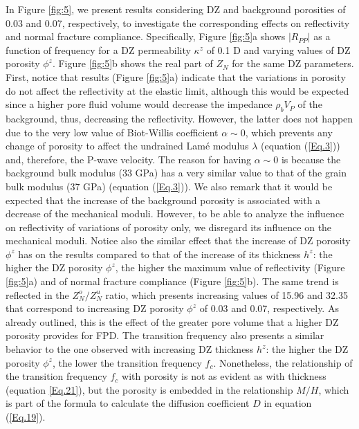 \documentclass[draft]{agujournal2019}
\begin{document}
In Figure \ref{fig:5}, we present results considering  DZ and background porosities of 0.03 and 0.07, respectively, to investigate the corresponding effects on reflectivity and normal fracture compliance. Specifically, Figure \ref{fig:5}a shows $|R_{PP}|$ as a function of frequency for a DZ permeability $ \kappa^z $ of 0.1 D and varying values of DZ porosity $\phi^z$. Figure \ref{fig:5}b shows the real part of $Z_N$ for the same DZ parameters.
First, notice that  results (Figure \ref{fig:5}a)  indicate that the variations in porosity do not affect the reflectivity at the elastic limit, although this would be expected since a higher pore fluid volume would decrease the impedance $\rho_b V_P$ of the background, thus, decreasing the reflectivity. However, the latter does not happen due to the very low value of Biot-Willis coefficient $\alpha \sim 0$, which prevents any change of porosity to affect the undrained Lamé modulus $\lambda$ (equation (\ref{Eq.3})) and, therefore, the  P-wave velocity. The reason for having  $\alpha \sim 0$ is because the background bulk modulus (33 GPa) has a very similar value to that of the grain bulk modulus (37 GPa) (equation (\ref{Eq.3})). We also remark that it would be expected that the increase of the background porosity is associated with a decrease of the mechanical moduli. However, to be able to analyze the influence on reflectivity of variations of porosity only, we disregard its influence on the mechanical moduli.
Notice also the similar effect that the increase of DZ porosity $\phi^z$ has on the results compared to that of the increase of its thickness $h^z$: the higher the DZ porosity $\phi^z$, the higher the maximum value of reflectivity (Figure \ref{fig:5}a) and of normal fracture compliance (Figure \ref{fig:5}b). The same trend is reflected in the $Z_N^o/Z_N^u$ ratio, which presents increasing values of 15.96 and  32.35  that correspond to increasing DZ porosity $\phi^z$ of 0.03 and 0.07, respectively. As already outlined, this is the effect of the greater pore volume that a higher DZ porosity provides for FPD.
The transition frequency also presents a similar behavior to the one observed with increasing DZ thickness $h^z$: the higher the DZ porosity $\phi^z$, the lower the transition frequency $f_c$. Nonetheless, the relationship of the transition frequency $f_c$ with porosity is not as evident as with thickness (equation \ref{Eq.21}), but the porosity is embedded in the relationship $M/H$, which is part of the formula to calculate the diffusion coefficient $D$ in equation (\ref{Eq.19}).
\end{document}
